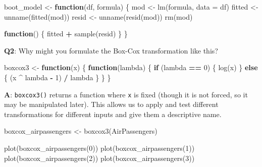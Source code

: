 \documentclass[
]{krantz}
\makeatletter
\newenvironment{Shaded}{\begin{snugshade}}{\end{snugshade}}
\newcommand{\ControlFlowTok}[1]{\textcolor[rgb]{0.13,0.29,0.53}{\textbf{#1}}}
\newcommand{\DataTypeTok}[1]{\textcolor[rgb]{0.13,0.29,0.53}{#1}}
\newcommand{\DecValTok}[1]{\textcolor[rgb]{0.00,0.00,0.81}{#1}}
\newcommand{\KeywordTok}[1]{\textcolor[rgb]{0.13,0.29,0.53}{\textbf{#1}}}
\newcommand{\NormalTok}[1]{#1}
\newcommand{\OperatorTok}[1]{\textcolor[rgb]{0.81,0.36,0.00}{\textbf{#1}}}
\newcommand{\StringTok}[1]{\textcolor[rgb]{0.31,0.60,0.02}{#1}}
\newenvironment{kframe}{%
\medskip{}
\setlength{\fboxsep}{.8em}
 \def\at@end@of@kframe{}%
 \ifinner\ifhmode%
  \def\at@end@of@kframe{\end{minipage}}%
  \begin{minipage}{\columnwidth}%
 \fi\fi%
 \def\FrameCommand##1{\hskip\@totalleftmargin \hskip-\fboxsep
 \colorbox{shadecolor}{##1}\hskip-\fboxsep
     \hskip-\linewidth \hskip-\@totalleftmargin \hskip\columnwidth}%
 \MakeFramed {\advance\hsize-\width
   \@totalleftmargin\z@ \linewidth\hsize
   \@setminipage}}%
 {\par\unskip\endMakeFramed%
 \at@end@of@kframe}
\renewenvironment{Shaded}{\begin{kframe}}{\end{kframe}}
\renewcommand{\KeywordTok} [1]{\textcolor[rgb]{0.00,0.44,0.13}{{#1}}}
\renewcommand{\DataTypeTok}[1]{\textcolor[rgb]{0.56,0.13,0.00}{{#1}}}
\renewcommand{\DecValTok}  [1]{\textcolor[rgb]{0.25,0.63,0.44}{{#1}}}
\renewcommand{\StringTok}  [1]{\textcolor[rgb]{0.25,0.44,0.63}{{#1}}}
\renewcommand{\NormalTok}  [1]{{#1}}
\makeatother
\begin{document}
\begin{Shaded}
\begin{Highlighting}[]
\NormalTok{boot_model <-}\StringTok{ }\ControlFlowTok{function}\NormalTok{(df, formula) \{}
\NormalTok{  mod <-}\StringTok{ }\KeywordTok{lm}\NormalTok{(formula, }\DataTypeTok{data =}\NormalTok{ df)}
\NormalTok{  fitted <-}\StringTok{ }\KeywordTok{unname}\NormalTok{(}\KeywordTok{fitted}\NormalTok{(mod))}
\NormalTok{  resid <-}\StringTok{ }\KeywordTok{unname}\NormalTok{(}\KeywordTok{resid}\NormalTok{(mod))}
  \KeywordTok{rm}\NormalTok{(mod)}
  
  \ControlFlowTok{function}\NormalTok{() \{}
\NormalTok{    fitted }\OperatorTok{+}\StringTok{ }\KeywordTok{sample}\NormalTok{(resid)}
\NormalTok{  \}}
\NormalTok{\} }
\end{Highlighting}
\end{Shaded}

\textbf{{Q2}}: Why might you formulate the Box-Cox transformation like this?

\begin{Shaded}
\begin{Highlighting}[]
\NormalTok{boxcox3 <-}\StringTok{ }\ControlFlowTok{function}\NormalTok{(x) \{}
  \ControlFlowTok{function}\NormalTok{(lambda) \{}
    \ControlFlowTok{if}\NormalTok{ (lambda }\OperatorTok{==}\StringTok{ }\DecValTok{0}\NormalTok{) \{}
      \KeywordTok{log}\NormalTok{(x)}
\NormalTok{    \} }\ControlFlowTok{else}\NormalTok{ \{}
\NormalTok{      (x }\OperatorTok{^}\StringTok{ }\NormalTok{lambda }\OperatorTok{-}\StringTok{ }\DecValTok{1}\NormalTok{) }\OperatorTok{/}\StringTok{ }\NormalTok{lambda}
\NormalTok{    \}}
\NormalTok{  \}  }
\NormalTok{\}}
\end{Highlighting}
\end{Shaded}

\textbf{{A}}: \texttt{boxcox3()} returns a function where \texttt{x} is fixed (though it is not forced, so it may be manipulated later). This allows us to apply and test different transformations for different inputs and give them a descriptive name.

\begin{Shaded}
\begin{Highlighting}[]
\NormalTok{boxcox_airpassengers <-}\StringTok{ }\KeywordTok{boxcox3}\NormalTok{(AirPassengers)}

\KeywordTok{plot}\NormalTok{(}\KeywordTok{boxcox_airpassengers}\NormalTok{(}\DecValTok{0}\NormalTok{))}
\KeywordTok{plot}\NormalTok{(}\KeywordTok{boxcox_airpassengers}\NormalTok{(}\DecValTok{1}\NormalTok{))}
\KeywordTok{plot}\NormalTok{(}\KeywordTok{boxcox_airpassengers}\NormalTok{(}\DecValTok{2}\NormalTok{))}
\KeywordTok{plot}\NormalTok{(}\KeywordTok{boxcox_airpassengers}\NormalTok{(}\DecValTok{3}\NormalTok{))}
\end{Highlighting}
\end{Shaded}
\end{document}
